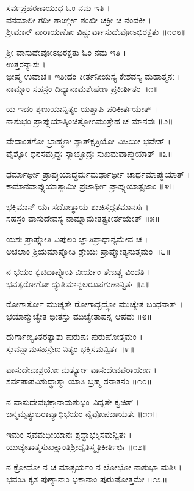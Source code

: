 ಸರ್ವಪ್ರಹರಣಾಯುಧ ಓಂ ನಮ ಇತಿ ।\\
ವನಮಾಲೀ ಗದೀ ಶಾರ್ಙ್ಗೀ ಶಂಖೀ ಚಕ್ರೀ ಚ ನಂದಕೀ ।\\
ಶ್ರೀಮಾನ್ ನಾರಾಯಣೋ ವಿಷ್ಣುರ್ವಾಸುದೇವೋಽಭಿರಕ್ಷತು ॥೧೦೮॥

ಶ್ರೀ ವಾಸುದೇವೋಽಭಿರಕ್ಷತು ಓಂ ನಮ ಇತಿ ।\\
ಉತ್ತರನ್ಯಾಸಃ ।\\
ಭೀಷ್ಮ ಉವಾಚ॥
ಇತೀದಂ ಕೀರ್ತನೀಯಸ್ಯ ಕೇಶವಸ್ಯ ಮಹಾತ್ಮನಃ ।\\
ನಾಮ್ನಾಂ ಸಹಸ್ರಂ ದಿವ್ಯಾನಾಮಶೇಷೇಣ ಪ್ರಕೀರ್ತಿತಂ ॥೧॥

ಯ ಇದಂ ಶೃಣುಯಾನ್ನಿತ್ಯಂ ಯಶ್ಚಾಪಿ ಪರಿಕೀರ್ತಯೇತ್ ।\\
ನಾಶುಭಂ ಪ್ರಾಪ್ನುಯಾತ್ಕಿಂಚಿತ್ಸೋಽಮುತ್ರೇಹ ಚ ಮಾನವಃ ॥೨॥

ವೇದಾಂತಗೋ ಬ್ರಾಹ್ಮಣಃ ಸ್ಯಾತ್ಕ್ಷತ್ರಿಯೋ ವಿಜಯೀ ಭವೇತ್ ।\\
ವೈಶ್ಯೋ ಧನಸಮೃದ್ಧಃ ಸ್ಯಾಚ್ಛೂದ್ರಃ ಸುಖಮವಾಪ್ನುಯಾತ್ ॥೩॥

ಧರ್ಮಾರ್ಥೀ ಪ್ರಾಪ್ನುಯಾದ್ಧರ್ಮಮರ್ಥಾರ್ಥೀ ಚಾರ್ಥಮಾಪ್ನುಯಾತ್ ।\\
ಕಾಮಾನವಾಪ್ನುಯಾತ್ಕಾಮೀ ಪ್ರಜಾರ್ಥೀ ಪ್ರಾಪ್ನುಯಾತ್ಪ್ರಜಾಂ ॥೪॥

ಭಕ್ತಿಮಾನ್ ಯಃ ಸದೋತ್ಥಾಯ ಶುಚಿಸ್ತದ್ಗತಮಾನಸಃ ।\\
ಸಹಸ್ರಂ ವಾಸುದೇವಸ್ಯ ನಾಮ್ನಾಮೇತತ್ಪ್ರಕೀರ್ತಯೇತ್ ॥೫॥

ಯಶಃ ಪ್ರಾಪ್ನೋತಿ ವಿಪುಲಂ ಜ್ಞಾತಿಪ್ರಾಧಾನ್ಯಮೇವ ಚ ।\\
ಅಚಲಾಂ ಶ್ರಿಯಮಾಪ್ನೋತಿ ಶ್ರೇಯಃ ಪ್ರಾಪ್ನೋತ್ಯನುತ್ತಮಂ ॥೬॥

ನ ಭಯಂ ಕ್ವಚಿದಾಪ್ನೋತಿ ವೀರ್ಯಂ ತೇಜಶ್ಚ ವಿಂದತಿ ।\\
ಭವತ್ಯರೋಗೋ ದ್ಯುತಿಮಾನ್ಬಲರೂಪಗುಣಾನ್ವಿತಃ ॥೭॥

ರೋಗಾರ್ತೋ ಮುಚ್ಯತೇ ರೋಗಾದ್ಬದ್ಧೋ ಮುಚ್ಯೇತ ಬಂಧನಾತ್ ।\\
ಭಯಾನ್ಮುಚ್ಯೇತ ಭೀತಸ್ತು ಮುಚ್ಯೇತಾಪನ್ನ ಆಪದಃ ॥೮॥

ದುರ್ಗಾಣ್ಯತಿತರತ್ಯಾಶು ಪುರುಷಃ ಪುರುಷೋತ್ತಮಂ ।\\
ಸ್ತುವನ್ನಾಮಸಹಸ್ರೇಣ ನಿತ್ಯಂ ಭಕ್ತಿಸಮನ್ವಿತಃ ॥೯॥

ವಾಸುದೇವಾಶ್ರಯೋ ಮರ್ತ್ಯೋ ವಾಸುದೇವಪರಾಯಣಃ ।\\
ಸರ್ವಪಾಪವಿಶುದ್ಧಾತ್ಮಾ ಯಾತಿ ಬ್ರಹ್ಮ ಸನಾತನಂ ॥೧೦॥

ನ ವಾಸುದೇವಭಕ್ತಾನಾಮಶುಭಂ ವಿದ್ಯತೇ ಕ್ವಚಿತ್ ।\\
ಜನ್ಮಮೃತ್ಯುಜರಾವ್ಯಾಧಿಭಯಂ ನೈವೋಪಜಾಯತೇ ॥೧೧॥

ಇಮಂ ಸ್ತವಮಧೀಯಾನಃ ಶ್ರದ್ಧಾಭಕ್ತಿಸಮನ್ವಿತಃ ।\\
ಯುಜ್ಯೇತಾತ್ಮಸುಖಕ್ಷಾಂತಿಶ್ರೀಧೃತಿಸ್ಮೃತಿಕೀರ್ತಿಭಿಃ ॥೧೨॥

ನ ಕ್ರೋಧೋ ನ ಚ ಮಾತ್ಸರ್ಯಂ ನ ಲೋಭೋ ನಾಶುಭಾ ಮತಿಃ ।\\
ಭವಂತಿ ಕೃತ ಪುಣ್ಯಾನಾಂ ಭಕ್ತಾನಾಂ ಪುರುಷೋತ್ತಮೇ ॥೧೩॥


